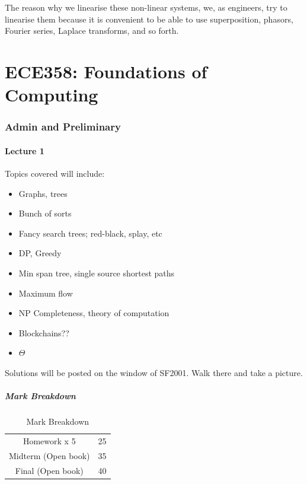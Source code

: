 \documentclass[10pt]{article}
\begin{document}
The reason why we linearise these non-linear systems, we, as engineers, try to linearise them because it is convenient to be able to use superposition, phasors, Fourier series, Laplace transforms, and so forth.











\part{ECE358: Foundations of Computing}


\section{Admin and Preliminary}

\subsection{Lecture 1}

Topics covered will include:
\begin{itemize}
	\item Graphs, trees
	\item Bunch of sorts
	\item Fancy search trees; red-black, splay, etc
	\item DP, Greedy
	\item Min span tree, single source shortest paths
	\item Maximum flow
	\item NP Completeness, theory of computation
	\item Blockchains??
	\item $ \Theta $ 
\end{itemize}

Solutions will be posted on the window of SF2001. Walk there and take a picture.

\subsubsection{Mark Breakdown}

\begin{table}[H]
	\centering
	\caption{Mark Breakdown}
	\begin{tabular}{|c|c|}
		\hline
		Homework x 5 & 25 \\
		Midterm (Open book) & 35 \\
		Final (Open book) & 40\\
		\hline
	\end{tabular}
\end{table}
\end{document}
